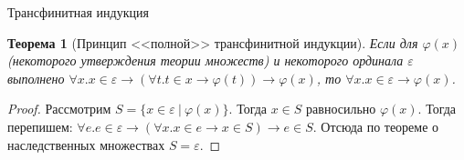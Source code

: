\documentclass[aspectratio=169]{beamer}
\newtheorem{thm}{Теорема}[section]
\begin{document}
\begin{frame}{Трансфинитная индукция}
\begin{thm}[Принцип <<полной>> трансфинитной индукции] Если для $\varphi(x)$ (некоторого утверждения
теории множеств) и некоторого ординала $\varepsilon$ выполнено
$\forall x.x \in \varepsilon \rightarrow (\forall t.t \in x \rightarrow \varphi(t)) \rightarrow \varphi(x)$,
то $\forall x.x \in \varepsilon \rightarrow \varphi(x)$.
\end{thm}
\begin{proof}Рассмотрим $S = \{ x\in \varepsilon\ |\ \varphi(x) \}$. Тогда $x \in S$ равносильно $\varphi(x)$.
Тогда перепишем: $\forall e.e \in \varepsilon \rightarrow (\forall x.x \in e \rightarrow x \in S) \rightarrow e \in S$.
Отсюда по теореме о наследственных множествах $S = \varepsilon$.\end{proof}
\end{frame}
\end{document}
